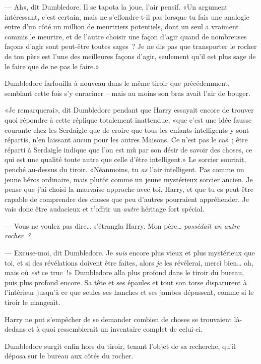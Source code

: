 --- Ah», dit Dumbledore. Il se tapota la joue, l'air pensif. «Un argument intéressant, c'est certain, mais ne s'effondre-t-il pas lorsque tu fais une analogie entre d'un côté un million de meurtriers potentiels, dont un seul a vraiment commis le meurtre, et de l'autre choisir une façon d'agir quand de nombreuses façons d'agir sont peut-être toutes sages~? Je ne dis pas que transporter le rocher de ton père est l'une des meilleures façons d'agir, seulement qu'il est plus sage de le faire que de ne pas le faire.»

Dumbledore farfouilla à nouveau dans le même tiroir que précédemment, semblant cette fois s'y enraciner -- mais au moins son bras avait l'air de bouger.

«Je remarquerai», dit Dumbledore pendant que Harry essayait encore de trouver quoi répondre à cette réplique totalement inattendue, «que c'est une idée fausse courante chez les Serdaigle que de croire que tous les enfants intelligents y sont répartis, n'en laissant aucun pour les autres Maisons. Ce n'est pas le cas~; être réparti à Serdaigle indique que l'on est mû par son désir de savoir des choses, ce qui est une qualité toute autre que celle d'être intelligent.» Le sorcier souriait, penché au-dessus du tiroir. «Néanmoins, tu \emph{as} l'air intelligent. Pas comme un jeune héros ordinaire, mais plutôt comme un jeune mystérieux sorcier ancien. Je pense que j'ai choisi la mauvaise approche avec toi, Harry, et que tu es peut-être capable de comprendre des choses que peu d'autres pourraient appréhender. Je vais donc être audacieux et t'offrir un \emph{autre} héritage fort spécial.

--- Vous ne voulez pas dire… s'étrangla Harry. Mon père… \emph{possédait un autre rocher~?}

--- Excuse-moi, dit Dumbledore. Je \emph{suis} encore plus vieux et plus mystérieux que toi, et si des révélations doivent être faites, alors \emph{je} les révélerai, merci bien… oh, mais où \emph{est} ce truc~!» Dumbledore alla plus profond dans le tiroir du bureau, puis plus profond encore. Sa tête et ses épaules et tout son torse disparurent à l'intérieur jusqu'à ce que seules ses hanches et ses jambes dépassent, comme si le tiroir le mangeait.

Harry ne put s'empêcher de se demander combien de choses se trouvaient là-dedans et à quoi ressemblerait un inventaire complet de celui-ci.

Dumbledore surgit enfin hors du tiroir, tenant l'objet de sa recherche, qu'il déposa sur le bureau aux côtés du rocher.

